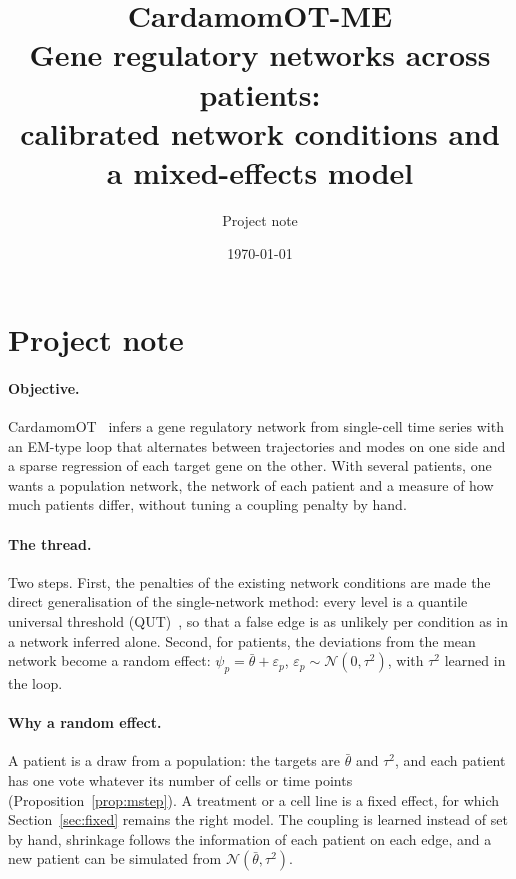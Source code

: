 \documentclass[a4paper, 11pt]{article}
\title{CardamomOT-ME\\[0.3em] \large Gene regulatory networks across patients:\\ calibrated network conditions and a mixed-effects model}
\author{Project note}
\date{\today}
\newcommand{\tb}{\bar\theta}
\theoremstyle{plain}
\theoremstyle{remark}
\begin{document}
\maketitle

\section*{Project note}

\paragraph{Objective.} CardamomOT~\cite{mauge2026cardamomot} infers a gene regulatory network from single-cell time series with an EM-type loop that alternates between trajectories and modes on one side and a sparse regression of each target gene on the other. With several patients, one wants a population network, the network of each patient and a measure of how much patients differ, without tuning a coupling penalty by hand.

\paragraph{The thread.} Two steps. First, the penalties of the existing network conditions are made the direct generalisation of the single-network method: every level is a quantile universal threshold (QUT)~\cite{giacobino2017qut}, so that a false edge is as unlikely per condition as in a network inferred alone. Second, for patients, the deviations from the mean network become a random effect: $\psi_p = \tb + \varepsilon_p$, $\varepsilon_p \sim \mathcal N(0, \tau^2)$, with $\tau^2$ learned in the loop.

\paragraph{Why a random effect.} A patient is a draw from a population: the targets are $\tb$ and $\tau^2$, and each patient has one vote whatever its number of cells or time points (Proposition~\ref{prop:mstep}). A treatment or a cell line is a fixed effect, for which Section~\ref{sec:fixed} remains the right model. The coupling is learned instead of set by hand, shrinkage follows the information of each patient on each edge, and a new patient can be simulated from $\mathcal N(\tb, \tau^2)$.
\end{document}

